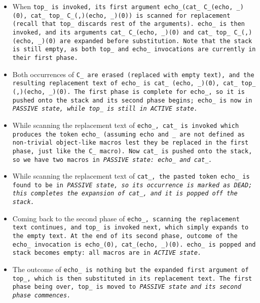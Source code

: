 \begin{itemize}[nosep]

\item When \tt{top_} is invoked, its first argument
\tt{echo_(cat_ C_(echo, _)(0), cat_ top_ C_(,)(echo, _)(0))} is scanned
for replacement (recall that \tt{top_} discards rest of the arguments).
\tt{echo_} is then invoked, and its arguments \tt{cat_ C_(echo, _)(0)}
and \tt{cat_ top_ C_(,)(echo, _)(0)} are expanded before substitution.
Note that the stack is still empty, as both \tt{top_} and
\tt{echo_} invocations are currently in their first phase.

\item Both occurrences of \tt{C_} are erased (replaced with empty text),
and the resulting replacement text of \tt{echo_} is
\tt{cat_ (echo, _)(0), cat_ top_ (,)(echo, _)(0)}.
The first phase is complete for \tt{echo_}, so it is pushed onto the stack
and its second phase begins; \tt{echo_} is now in \it{\tt{PASSIVE}} state,
while \tt{top_} is still in \it{\tt{ACTIVE}} state.

\item While scanning the replacement text of  \tt{echo_},
\tt{cat_} is invoked which produces the token \tt{echo_}
(assuming \tt{echo} and \tt{_} are not defined as non-trivial object-like
macros lest they be replaced in the first phase, just like the \tt{C_} macro).
Now \tt{cat_} is pushed onto the stack, so we have two
macros in \it{\tt{PASSIVE}} state: \tt{echo_} and \tt{cat_}.

\item While scanning the replacement text of \tt{cat_},
the pasted token \tt{echo_} is found to be in \it{\tt{PASSIVE}} state,
so its occurrence is marked as \it{\tt{DEAD}};
this completes the expansion of \tt{cat_}, and it is popped off the stack.

\item Coming back to the second phase of \tt{echo_},
scanning the replacement text continues,
and \tt{top_} is invoked next, which simply expands to the empty text.
At the end of its second phase,
outcome of the \tt{echo_} invocation is \tt{echo_(0), cat_(echo, _)(0)}.
\tt{echo_} is popped and stack becomes empty:
all macros are in \it{\tt{ACTIVE}} state.

\item The outcome of \tt{echo_} is nothing but the expanded first
argument of \tt{top_}, which is then substituted in its replacement text.
The first phase being over, \tt{top_} is moved to
\it{\tt{PASSIVE}} state and its second phase commences.


\end{itemize}
